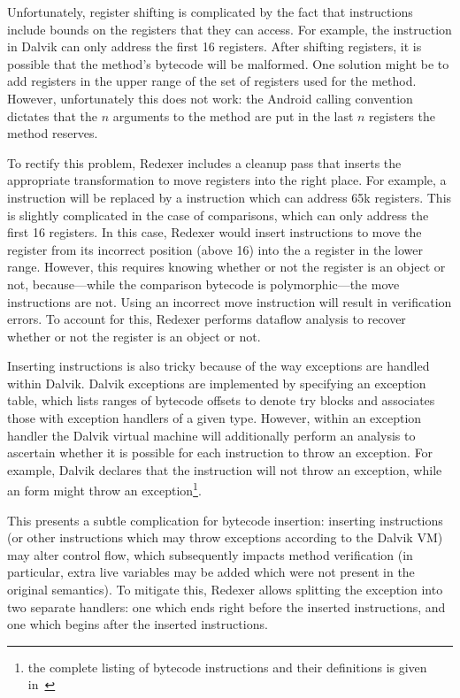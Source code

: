 Unfortunately, register shifting is complicated by the fact that
instructions include bounds on the registers that they can access. For
example, the  instruction in Dalvik can only address the
first 16 registers. After shifting registers, it is possible that the
method's bytecode will be malformed. One solution might be to add
registers in the upper range of the set of registers used for the
method. However, unfortunately this does not work: the Android calling
convention dictates that the $n$ arguments to the method are put in
the last $n$ registers the method reserves. 

To rectify this problem, Redexer includes a cleanup pass that inserts
the appropriate transformation to move registers into the right
place. For example, a  instruction will be replaced by a
 instruction which can address 65k registers. This
is slightly complicated in the case of comparisons, which can only
address the first 16 registers. In this case, Redexer would insert
instructions to move the register from its incorrect position (above
16) into the a register in the lower range. However, this requires
knowing whether or not the register is an object or not,
because---while the comparison bytecode is polymorphic---the move
instructions are not. Using an incorrect move instruction will result
in verification errors. To account for this, Redexer performs dataflow
analysis to recover whether or not the register is an object or not.

Inserting instructions is also tricky because of the way exceptions
are handled within Dalvik. Dalvik exceptions are implemented by
specifying an exception table, which lists ranges of bytecode offsets
to denote try blocks and associates those with exception handlers of a
given type. However, within an exception handler the Dalvik virtual
machine will additionally perform an analysis to ascertain whether it
is possible for each instruction to throw an exception. For example,
Dalvik declares that the  instruction will not throw an
exception, while an  form might throw an
exception\footnote{the complete listing of bytecode instructions and
  their definitions is given in~\cite{canthrowtable}}.

This presents a subtle complication for bytecode insertion: inserting
 instructions (or other instructions which may throw
exceptions according to the Dalvik VM) may alter control flow, which
subsequently impacts method verification (in particular, extra live
variables may be added which were not present in the original
semantics). To mitigate this, Redexer allows splitting the exception
into two separate handlers: one which ends right before the inserted
instructions, and one which begins after the inserted
instructions.

